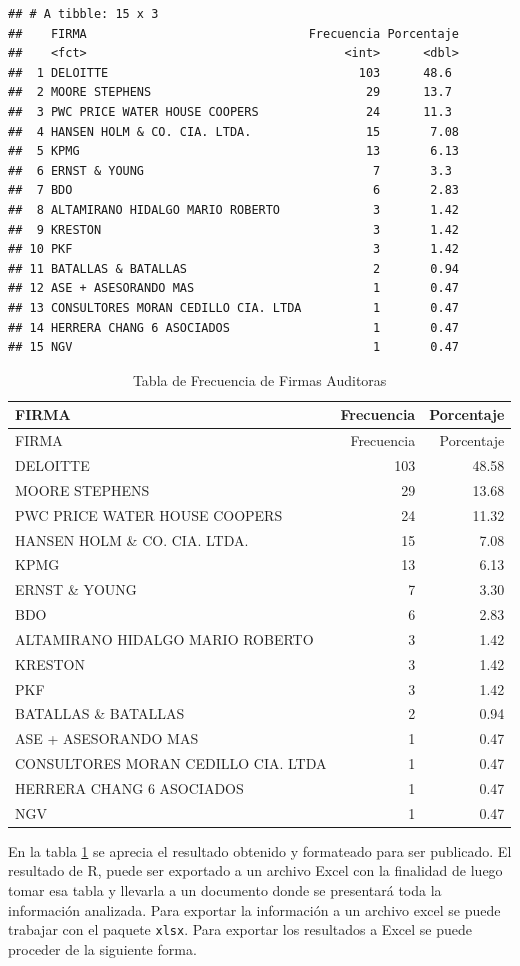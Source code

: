 \documentclass[letterpaper,]{book}
\begin{document}
\begin{verbatim}
## # A tibble: 15 x 3
##    FIRMA                               Frecuencia Porcentaje
##    <fct>                                    <int>      <dbl>
##  1 DELOITTE                                   103      48.6 
##  2 MOORE STEPHENS                              29      13.7 
##  3 PWC PRICE WATER HOUSE COOPERS               24      11.3 
##  4 HANSEN HOLM & CO. CIA. LTDA.                15       7.08
##  5 KPMG                                        13       6.13
##  6 ERNST & YOUNG                                7       3.3 
##  7 BDO                                          6       2.83
##  8 ALTAMIRANO HIDALGO MARIO ROBERTO             3       1.42
##  9 KRESTON                                      3       1.42
## 10 PKF                                          3       1.42
## 11 BATALLAS & BATALLAS                          2       0.94
## 12 ASE + ASESORANDO MAS                         1       0.47
## 13 CONSULTORES MORAN CEDILLO CIA. LTDA          1       0.47
## 14 HERRERA CHANG 6 ASOCIADOS                    1       0.47
## 15 NGV                                          1       0.47
\end{verbatim}

\begin{longtable}[]{@{}lrr@{}}
\caption{\label{tab:tabla2}Tabla de Frecuencia de Firmas Auditoras}\tabularnewline
\toprule
FIRMA & Frecuencia & Porcentaje\tabularnewline
\midrule
\endfirsthead
\toprule
FIRMA & Frecuencia & Porcentaje\tabularnewline
\midrule
\endhead
DELOITTE & 103 & 48.58\tabularnewline
MOORE STEPHENS & 29 & 13.68\tabularnewline
PWC PRICE WATER HOUSE COOPERS & 24 & 11.32\tabularnewline
HANSEN HOLM \& CO. CIA. LTDA. & 15 & 7.08\tabularnewline
KPMG & 13 & 6.13\tabularnewline
ERNST \& YOUNG & 7 & 3.30\tabularnewline
BDO & 6 & 2.83\tabularnewline
ALTAMIRANO HIDALGO MARIO ROBERTO & 3 & 1.42\tabularnewline
KRESTON & 3 & 1.42\tabularnewline
PKF & 3 & 1.42\tabularnewline
BATALLAS \& BATALLAS & 2 & 0.94\tabularnewline
ASE + ASESORANDO MAS & 1 & 0.47\tabularnewline
CONSULTORES MORAN CEDILLO CIA. LTDA & 1 & 0.47\tabularnewline
HERRERA CHANG 6 ASOCIADOS & 1 & 0.47\tabularnewline
NGV & 1 & 0.47\tabularnewline
\bottomrule
\end{longtable}

En la tabla \ref{tab:tabla2} se aprecia el resultado obtenido y formateado para ser publicado. El resultado de R, puede ser exportado a un archivo Excel con la finalidad de luego tomar esa tabla y llevarla a un documento donde se presentará toda la información analizada. Para exportar la información a un archivo excel se puede trabajar con el paquete \texttt{xlsx}. Para exportar los resultados a Excel se puede proceder de la siguiente forma.
\end{document}
